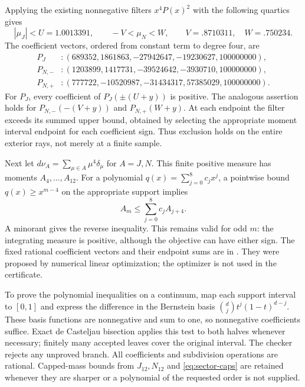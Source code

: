 \documentclass[11pt,a4paper]{article}
\begin{document}
Applying the existing nonnegative filters $x^4P(x)^2$ with the following
quartics gives
\begin{equation}\label{eq:sector-caps}
 |\mu_J|<U=1.0013391,\qquad -V<\mu_N<W,
 \qquad V=.8710311,\quad W=.750234.
\end{equation}
The coefficient vectors, ordered from constant term to degree four, are
\begin{align*}
 P_J &: (689352,1861863,-27942647,-19230627,100000000),\\
 P_{N,-} &: (1203899,1417731,-39524642,-3930710,100000000),\\
 P_{N,+} &: (777722,-10520987,-31434317,57385029,100000000).
\end{align*}
For $P_J$, every coefficient of $P_J(\pm(U+y))$ is positive.
The analogous assertion holds for $P_{N,-}(-(V+y))$ and
$P_{N,+}(W+y)$. At each endpoint the filter exceeds its summed upper
bound, obtained by selecting the appropriate moment interval endpoint
for each coefficient sign. Thus exclusion holds on the entire exterior
rays, not merely at a finite sample.

Next let $d\nu_A=\sum_{\mu\in A}\mu^4\delta_\mu$ for $A=J,N$.
This finite positive measure has moments $A_4,\ldots,A_{12}$.
For a polynomial $q(x)=\sum_{j=0}^8c_jx^j$, a pointwise bound
$q(x)\ge x^{m-4}$ on the appropriate support implies
\[
 A_m\le\sum_{j=0}^8c_j A_{j+4}.
\]
A minorant gives the reverse inequality. This remains valid for odd
$m$: the integrating measure is positive, although the objective can
have either sign. The fixed rational coefficient vectors and their
endpoint sums are in .
They were proposed by numerical linear optimization; the optimizer is
not used in the certificate.

To prove the polynomial inequalities on a continuum, map each support
interval to $[0,1]$ and express the difference in the Bernstein basis
$\binom{d}{j}t^j(1-t)^{d-j}$. These basis functions are nonnegative and
sum to one, so nonnegative coefficients suffice. Exact de Casteljau
bisection applies this test to both halves whenever necessary; finitely
many accepted leaves cover the original interval. The checker rejects
any unproved branch. All coefficients and subdivision operations are
rational. Capped-mass bounds from $J_{12},N_{12}$ and
\eqref{eq:sector-caps} are retained whenever they are sharper or a
polynomial of the requested order is not supplied.
\end{document}
